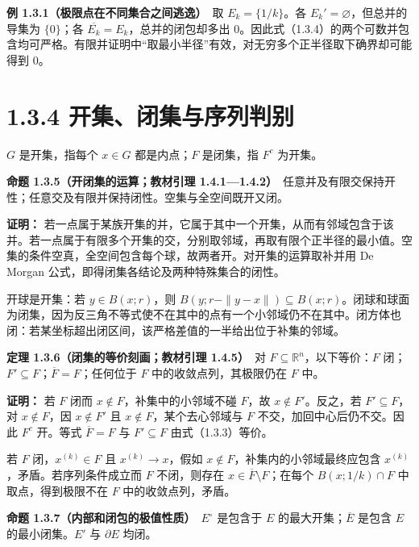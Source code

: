 \documentclass[11pt,a4paper]{article}
\begin{document}
\textbf{例 1.3.1（极限点在不同集合之间逃逸）}　取 \(E_k=\{1/k\}\)。各
\(E_k'=\varnothing\)，但总并的导集为 \(\{0\}\)；各
\(\overline{E_k}=E_k\)，总并的闭包却多出
\(0\)。因此式（1.3.4）的两个可数并包含均可严格。有限并证明中``取最小半径''有效，对无穷多个正半径取下确界却可能得到
\(0\)。

\section[\S{}1.3.4
开集、闭集与序列判别]{1.3.4
开集、闭集与序列判别}\label{ux5f00ux96c6ux95edux96c6ux4e0eux5e8fux5217ux5224ux522b}

\(G\) 是开集，指每个 \(x\in G\) 都是内点；\(F\) 是闭集，指 \(F^c\)
为开集。

\textbf{命题 1.3.5（开闭集的运算；教材引理
1.4.1---1.4.2）}　任意并及有限交保持开性；任意交及有限并保持闭性。空集与全空间既开又闭。

\textbf{证明：}
若一点属于某族开集的并，它属于其中一个开集，从而有邻域包含于该并。若一点属于有限多个开集的交，分别取邻域，再取有限个正半径的最小值。空集的条件空真，全空间包含每个球，故两者开。对开集的运算取补并用
De Morgan 公式，即得闭集各结论及两种特殊集合的闭性。

开球是开集：若 \(y\in B(x;r)\)，则
\(B(y;r-\|y-x\|)\subseteq B(x;r)\)。闭球和球面为闭集，因为反三角不等式使不在其中的点有一个小邻域仍不在其中。闭方体也闭：若某坐标超出闭区间，该严格差值的一半给出位于补集的邻域。

\textbf{定理 1.3.6（闭集的等价刻画；教材引理 1.4.5）}　对
\(F\subseteq\mathbb R^n\)，以下等价：\(F\)
闭；\(F'\subseteq F\)；\(\overline F=F\)；任何位于 \(F\)
中的收敛点列，其极限仍在 \(F\) 中。

\textbf{证明：} 若 \(F\) 闭而 \(x\notin F\)，补集中的小邻域不碰
\(F\)，故 \(x\notin F'\)。反之，若 \(F'\subseteq F\)，对
\(x\notin F\)，因 \(x\notin F'\) 且 \(x\notin F\)，某个去心邻域与 \(F\)
不交，加回中心后仍不交。因此 \(F^c\) 开。等式 \(\overline F=F\) 与
\(F'\subseteq F\) 由式（1.3.3）等价。

若 \(F\) 闭，\(x^{(k)}\in F\) 且 \(x^{(k)}\to x\)，假如
\(x\notin F\)，补集内的小邻域最终应包含
\(x^{(k)}\)，矛盾。若序列条件成立而 \(F\) 不闭，则存在
\(x\in\overline F\setminus F\)；在每个 \(B(x;1/k)\cap F\)
中取点，得到极限不在 \(F\) 中的收敛点列，矛盾。

\textbf{命题 1.3.7（内部和闭包的极值性质）}　\(E^\circ\) 是包含于 \(E\)
的最大开集；\(\overline E\) 是包含 \(E\) 的最小闭集。\(E'\) 与
\(\partial E\) 均闭。
\end{document}

